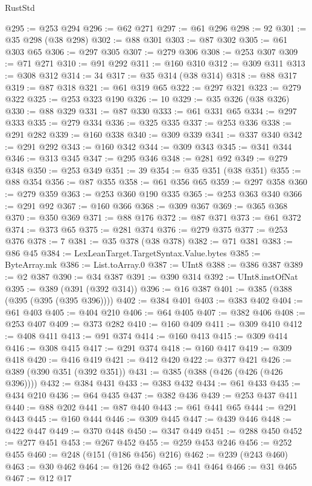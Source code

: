 \begin{lexlean}{RustStd}
\begin{coremodule}
@295 := @253 @294
@296 := @62 @271
@297 := @61 @296
@298 := 92
@301 := @35 @298 (@38 @298)
@302 := @88 @301
@303 := @87 @302
@305 := @61 @303 @65
@306 := @297 @305
@307 := @279 @306
@308 := @253 @307
@309 := @71 @271
@310 := @91 @292
@311 := @160 @310
@312 := @309 @311
@313 := @308 @312
@314 := 34
@317 := @35 @314 (@38 @314)
@318 := @88 @317
@319 := @87 @318
@321 := @61 @319 @65
@322 := @297 @321
@323 := @279 @322
@325 := @253 @323 @190
@326 := 10
@329 := @35 @326 (@38 @326)
@330 := @88 @329
@331 := @87 @330
@333 := @61 @331 @65
@334 := @297 @333
@335 := @279 @334
@336 := @325 @335
@337 := @253 @336
@338 := @291 @282
@339 := @160 @338
@340 := @309 @339
@341 := @337 @340
@342 := @291 @292
@343 := @160 @342
@344 := @309 @343
@345 := @341 @344
@346 := @313 @345
@347 := @295 @346
@348 := @281 @92
@349 := @279 @348
@350 := @253 @349
@351 := 39
@354 := @35 @351 (@38 @351)
@355 := @88 @354
@356 := @87 @355
@358 := @61 @356 @65
@359 := @297 @358
@360 := @279 @359
@363 := @253 @360 @190 @335
@365 := @253 @363 @340
@366 := @291 @92
@367 := @160 @366
@368 := @309 @367
@369 := @365 @368
@370 := @350 @369
@371 := @88 @176
@372 := @87 @371
@373 := @61 @372
@374 := @373 @65
@375 := @281 @374
@376 := @279 @375
@377 := @253 @376
@378 := 7
@381 := @35 @378 (@38 @378)
@382 := @71 @381
@383 := @86 @45
@384 := LexLeanTarget.TargetSyntax.Value.bytes
@385 := ByteArray.mk
@386 := List.toArray.{0}
@387 := UInt8
@388 := @386 @387
@389 := @2 @387
@390 := @34 @387
@391 := @390 @314
@392 := UInt8.instOfNat
@395 := @389 (@391 (@392 @314))
@396 := @16 @387
@401 := @385 (@388 (@395 (@395 (@395 @396))))
@402 := @384 @401
@403 := @383 @402
@404 := @61 @403
@405 := @404 @210
@406 := @64 @405
@407 := @382 @406
@408 := @253 @407
@409 := @373 @282
@410 := @160 @409
@411 := @309 @410
@412 := @408 @411
@413 := @91 @374
@414 := @160 @413
@415 := @309 @414
@416 := @308 @415
@417 := @291 @374
@418 := @160 @417
@419 := @309 @418
@420 := @416 @419
@421 := @412 @420
@422 := @377 @421
@426 := @389 (@390 @351 (@392 @351))
@431 := @385 (@388 (@426 (@426 (@426 @396))))
@432 := @384 @431
@433 := @383 @432
@434 := @61 @433
@435 := @434 @210
@436 := @64 @435
@437 := @382 @436
@439 := @253 @437 @411
@440 := @88 @202
@441 := @87 @440
@443 := @61 @441 @65
@444 := @291 @443
@445 := @160 @444
@446 := @309 @445
@447 := @439 @446
@448 := @422 @447
@449 := @370 @448
@450 := @347 @449
@451 := @288 @450
@452 := @277 @451
@453 := @267 @452
@455 := @259 @453 @246
@456 := @252 @455
@460 := @248 (@151 (@186 @456) @216)
@462 := @239 (@243 @460)
@463 := @30 @462
@464 := @126 @42
@465 := @41 @464
@466 := @31 @465
@467 := @12 @17

\end{coremodule}
\end{lexlean}
